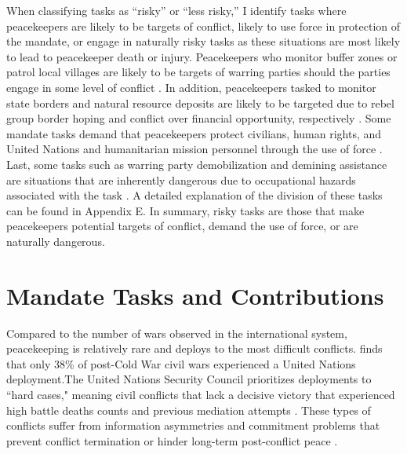 \documentclass[12pt]{article}
\begin{document}

When classifying tasks as ``risky'' or ``less risky,'' I identify tasks where peacekeepers are likely to be targets of conflict, likely to use force in protection of the mandate, or engage in naturally risky tasks as these situations are most likely to lead to peacekeeper death or injury. Peacekeepers who monitor buffer zones or patrol local villages are likely to be targets of warring parties should the parties engage in some level of conflict \citep{fjelde2019,townsen2014}. In addition, peacekeepers tasked to monitor state borders and natural resource deposits are likely to be targeted due to rebel group border hoping and conflict over financial opportunity, respectively \citep{beardsley2011,townsen2014}. Some mandate tasks demand that peacekeepers protect civilians, human rights, and United Nations and humanitarian mission personnel through the use of force \citep{hultman2013united}. Last, some tasks such as warring party demobilization and demining assistance are situations that are inherently dangerous due to occupational hazards associated with the task \citep{DDR,demining}. A detailed explanation of the division of these tasks can be found in Appendix E. In summary, risky tasks are those that make peacekeepers potential targets of conflict, demand the use of force, or are naturally dangerous. 



\section*{Mandate Tasks and Contributions}

\indent Compared to the number of wars observed in the international system, peacekeeping is relatively rare and deploys to the most difficult conflicts. \cite{fortna2008} finds that only 38\% of post-Cold War civil wars experienced a United Nations deployment.\footnotemark[5] The United Nations Security Council prioritizes deployments to ``hard cases," meaning civil conflicts that lack a decisive victory that experienced high battle deaths counts and previous mediation attempts \citep{gilligan2003, fortna2004, mullenbach2005}. These types of conflicts suffer from information asymmetries and commitment problems that prevent conflict termination or hinder long-term post-conflict peace \citep{walter2009}.   
\end{document}
